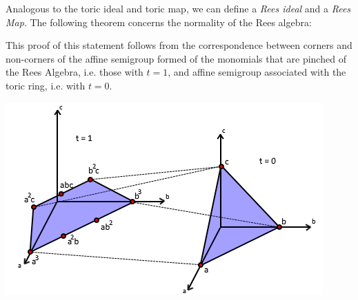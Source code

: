 \documentclass[a0, landscape]{a0poster}
\begin{document}
\begin{multicols}{4}
Analogous to the toric ideal and toric map, we can define a \textit{Rees ideal} and a \textit{Rees Map}. The following theorem concerns the normality of the Rees algebra: 


This proof of this statement follows from the correspondence between corners and non-corners of the affine semigroup formed of the monomials that are pinched of the Rees Algebra, i.e. those with $t=1$, and affine semigroup associated with the toric ring, i.e. with $t=0$.

\begin{center}
\includegraphics[width=0.70\linewidth]{reduction.png}
\end{center}


\end{multicols}
\end{document}
